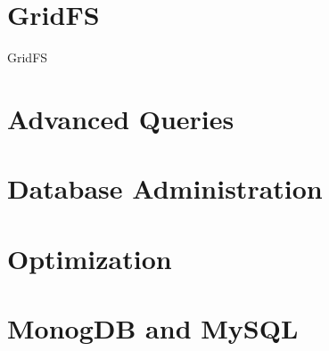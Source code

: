 \documentclass{beamer}
\begin{document}
\section{GridFS}
\begin{frame}{GridFS}
    
\end{frame}

\section{Advanced Queries}
\begin{frame}
    
\end{frame}

\section{Database Administration}
\begin{frame}
    
\end{frame}

\section{Optimization}
\begin{frame}
    
\end{frame}

\section{MonogDB and MySQL}
\begin{frame}
    
\end{frame}
\end{document}
